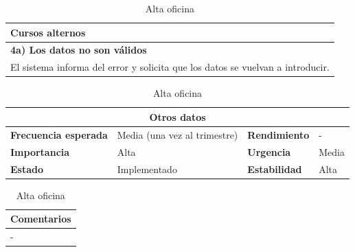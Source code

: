 \documentclass[12pt,spanish]{article}
\begin{document}
\begin{table}[H]
\vspace{1cm}

\begin{tabular}{|m{10pt}|m{7.15cm}|m{10pt}|m{7.15cm}|}
\hline
\multicolumn{4}{|m{16.2cm}|}{\textbf{Cursos alternos}} \\
\hline
\multicolumn{4}{|m{16.2cm}|}{\textbf{4a) Los datos no son válidos}} \\
\hline
\multicolumn{4}{|m{16.2cm}|}{El sistema informa del error y solicita que los datos se vuelvan a introducir.} \\
\hline
\end{tabular}

\vspace{1cm}

\begin{tabular}{|m{3.72cm}|m{3.72cm}|m{3.72cm}|m{3.72cm}|}
\hline
\multicolumn{4}{|c|}{\textbf{Otros datos}} \\
\hline
\textbf{Frecuencia esperada} & Media (una vez al trimestre) & \textbf{Rendimiento} & - \\
\hline
\textbf{Importancia} & Alta & \textbf{Urgencia} & Media \\
\hline
\textbf{Estado} & Implementado & \textbf{Estabilidad} & Alta \\
\hline
\end{tabular}

\vspace{1cm}

\begin{tabular}{|m{16.2cm}|}
\hline
\textbf{Comentarios} \\
\hline
- \\
\hline
\end{tabular}

\caption{Alta oficina}

\end{table}

\end{document}

